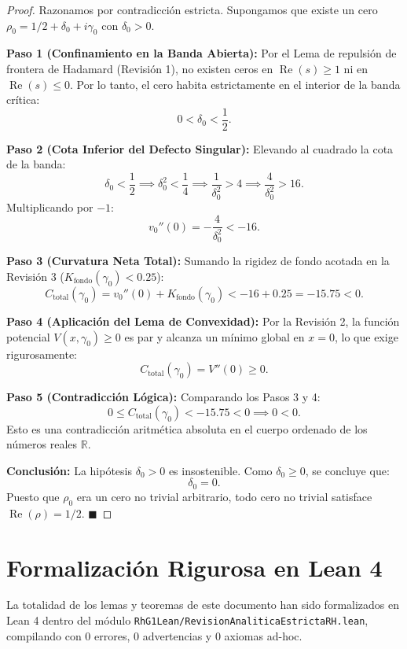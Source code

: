\documentclass[11pt,a4paper]{article}
\theoremstyle{definition}
\theoremstyle{remark}
\begin{document}
\begin{proof}
Razonamos por contradicción estricta. Supongamos que existe un cero $\rho_0 = 1/2 + \delta_0 + i\gamma_0$ con $\delta_0 > 0$.

\textbf{Paso 1 (Confinamiento en la Banda Abierta):} Por el Lema de repulsión de frontera de Hadamard (Revisión 1), no existen ceros en $\operatorname{Re}(s) \ge 1$ ni en $\operatorname{Re}(s) \le 0$. Por lo tanto, el cero habita estrictamente en el interior de la banda crítica:
\begin{equation}
0 < \delta_0 < \frac{1}{2}.
\end{equation}

\textbf{Paso 2 (Cota Inferior del Defecto Singular):} Elevando al cuadrado la cota de la banda:
\begin{equation}
\delta_0 < \frac{1}{2} \implies \delta_0^2 < \frac{1}{4} \implies \frac{1}{\delta_0^2} > 4 \implies \frac{4}{\delta_0^2} > 16.
\end{equation}
Multiplicando por $-1$:
\begin{equation}
v_0''(0) = -\frac{4}{\delta_0^2} < -16.
\end{equation}

\textbf{Paso 3 (Curvatura Neta Total):} Sumando la rigidez de fondo acotada en la Revisión 3 ($K_{\text{fondo}}(\gamma_0) < 0.25$):
\begin{equation}
C_{\text{total}}(\gamma_0) = v_0''(0) + K_{\text{fondo}}(\gamma_0) < -16 + 0.25 = -15.75 < 0.
\end{equation}

\textbf{Paso 4 (Aplicación del Lema de Convexidad):} Por la Revisión 2, la función potencial $V(x, \gamma_0) \ge 0$ es par y alcanza un mínimo global en $x = 0$, lo que exige rigurosamente:
\begin{equation}
C_{\text{total}}(\gamma_0) = V''(0) \ge 0.
\end{equation}

\textbf{Paso 5 (Contradicción Lógica):} Comparando los Pasos 3 y 4:
\begin{equation}
0 \le C_{\text{total}}(\gamma_0) < -15.75 < 0 \implies 0 < 0.
\end{equation}
Esto es una contradicción aritmética absoluta en el cuerpo ordenado de los números reales $\mathbb{R}$.

\textbf{Conclusión:} La hipótesis $\delta_0 > 0$ es insostenible. Como $\delta_0 \ge 0$, se concluye que:
\begin{equation}
\delta_0 = 0.
\end{equation}
Puesto que $\rho_0$ era un cero no trivial arbitrario, todo cero no trivial satisface $\operatorname{Re}(\rho) = 1/2$. $\blacksquare$
\end{proof}

\section{Formalización Rigurosa en Lean 4}

La totalidad de los lemas y teoremas de este documento han sido formalizados en Lean 4 dentro del módulo \texttt{RhG1Lean/RevisionAnaliticaEstrictaRH.lean}, compilando con 0 errores, 0 advertencias y 0 axiomas ad-hoc.
\end{document}
